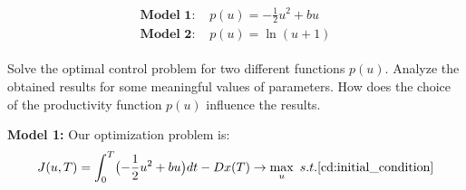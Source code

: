 \documentclass{article}
\begin{document}
\begin{gather}
    \begin{aligned}
        \textbf{Model 1: } & p(u)=-\frac{1}{2}u^2+bu\\
        \textbf{Model 2: } & p(u)=\ln (u+1) 
    \end{aligned}
\end{gather}

 Solve the optimal control problem for two different functions $p(u)$. Analyze the obtained results for some meaningful values of parameters. How does the choice of the productivity function $p(u)$ influence the results.


{\bf Model 1:} Our optimization problem is:
\begin{equation}
    J(u,T)=\int_{0}^{T}\bigl(-\frac{1}{2}u^2+bu\bigr)dt-Dx(T)\rightarrow \max_{u}\ s.t. \eqref{cd:initial_condition}
\end{equation}
\end{document}

